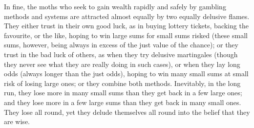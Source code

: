 \documentclass[letterpaper,12pt,oneside,openany]{memoir}
\begin{document}
In fine, the moths who seek to gain wealth rapidly
and safely by gambling methods and systems are attracted
almost equally by two equally delusive flames.
They either trust in their own good luck, as in buying
lottery tickets, backing the favourite, or the like,
hoping to win large sums for small sums risked (these
small sums, however, being always in excess of the just
value of the chance); or they trust in the bad luck of
others, as when they try delusive martingales (though
they never see what they are really doing in such cases),
or when they lay long odds (always longer than the just
odds), hoping to win many small sums at small risk of
losing large ones; or they combine both methods.
Inevitably, in the long run, they lose more in many small
sums than they get back in a few large ones; and they
lose more in a few large sums than they get back in
many small ones. They lose all round, yet they delude
themselves all round into the belief that they are wise.
\clearpage
\end{document}
